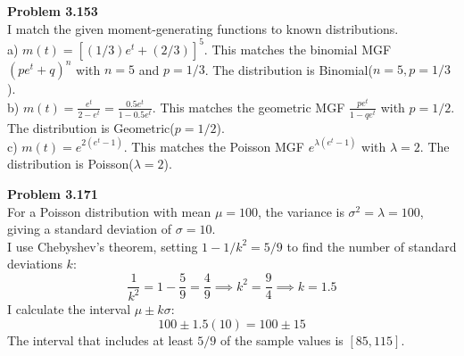 \documentclass[12pt]{article}
\begin{document}
\noindent \textbf{Problem 3.153} \\
I match the given moment-generating functions to known distributions.\\
a) $m(t) = [(1/3)e^t + (2/3)]^5$. This matches the binomial MGF $(pe^t + q)^n$ with $n = 5$ and $p = 1/3$. The distribution is Binomial($n=5, p=1/3$). \\
b) $m(t) = \frac{e^t}{2 - e^t} = \frac{0.5 e^t}{1 - 0.5 e^t}$. This matches the geometric MGF $\frac{pe^t}{1 - qe^t}$ with $p = 1/2$. The distribution is Geometric($p=1/2$). \\
c) $m(t) = e^{2(e^t - 1)}$. This matches the Poisson MGF $e^{\lambda(e^t - 1)}$ with $\lambda = 2$. The distribution is Poisson($\lambda=2$).

\vspace{0.5cm}

\noindent \textbf{Problem 3.171} \\
For a Poisson distribution with mean $\mu = 100$, the variance is $\sigma^2 = \lambda = 100$, giving a standard deviation of $\sigma = 10$. \\
I use Chebyshev's theorem, setting $1 - 1/k^2 = 5/9$ to find the number of standard deviations $k$:
\[ \frac{1}{k^2} = 1 - \frac{5}{9} = \frac{4}{9} \implies k^2 = \frac{9}{4} \implies k = 1.5 \]
I calculate the interval $\mu \pm k\sigma$:
\[ 100 \pm 1.5(10) = 100 \pm 15 \]
The interval that includes at least $5/9$ of the sample values is $[85, 115]$.
\end{document}
